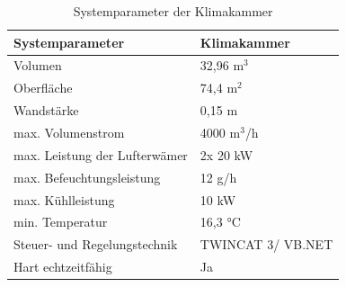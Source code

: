 \begin{table}[htb]
\centering
\caption{Systemparameter der Klimakammer \citep{Nuerenberg2015}}\vspace{6pt}
\label{tab:Parameter KK}
\begin{tabular}{ll}
\hline 
\textbf{Systemparameter} & \textbf{Klimakammer} \\ 
\hline 
\hline
Volumen & 32,96 m$^3$ \\ 
\hline 
Oberfläche & 74,4 m$^2$ \\ 
\hline 
Wandstärke & 0,15 m \\ 
\hline 
max. Volumenstrom & 4000 m$^3$/h \\ 
\hline 
max. Leistung der Lufterwämer & 2x 20 kW \\ 
\hline 
max. Befeuchtungsleistung & 12 g/h \\ 
\hline 
max. Kühlleistung & 10 kW \\ 
\hline 
min. Temperatur & 16,3 °C \\ 
\hline 
Steuer- und Regelungstechnik & TWINCAT 3/ VB.NET \\ 
\hline 
Hart echtzeitfähig & Ja \\ 
\hline 
\hline
\end{tabular} 
\label{tab:Systemparameter-KK}
\end{table} 

